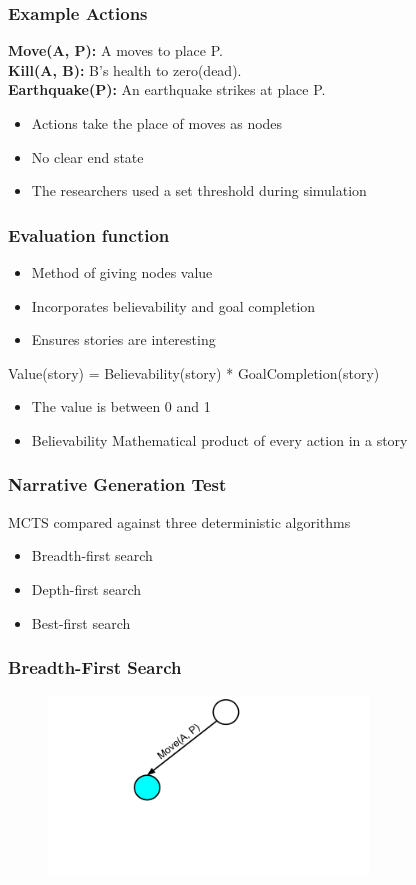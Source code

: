 \documentclass{beamer}
\begin{document}
\begin{frame}
\frametitle{Example Actions}
\textbf{Move(A, P):} A moves to place P. \\
\textbf{Kill(A, B):} B's health to zero(dead). \\
\textbf{Earthquake(P):} An earthquake strikes at place P.
\begin{itemize}
	\item Actions take the place of moves as nodes
	\item No clear end state
	\item The researchers used a set threshold during simulation
\end{itemize}
\end{frame}

\begin{frame}
\frametitle{Evaluation function}
\begin{itemize}
	\item Method of giving nodes value
	\item Incorporates believability and goal completion
	\item Ensures stories are interesting
\end{itemize}
Value(story) = Believability(story) * GoalCompletion(story) 
\begin{itemize}
	\item The value is between 0 and 1
	\item Believability Mathematical product of every action in a story
\end{itemize}
\end{frame}

\begin{frame}
\frametitle{Narrative Generation Test}
MCTS compared against three deterministic algorithms
\begin{itemize}
	\item Breadth-first search
	\item Depth-first search
	\item Best-first search
\end{itemize}
\end{frame}

\begin{frame}[fragile]
\frametitle{Breadth-First Search}
\begin{figure}[h]
	\includegraphics[width=8.5cm]{Diagrams/BreadthFirst/BreadthTreeOne.pdf}
	\centering
\end{figure}
\end{frame}
\end{document}
